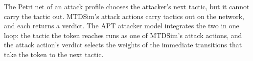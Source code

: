 \documentclass{cshonours}
\begin{document}
The Petri net of an attack profile chooses the attacker's next tactic, but it
cannot carry the tactic out. MTDSim's attack actions carry tactics out on the
network, and each returns a verdict. The APT attacker model integrates the two
in one loop: the tactic the token reaches runs as one of MTDSim's attack
actions, and the attack action's verdict selects the weights of the immediate
transitions that take the token to the next tactic.
\end{document}
